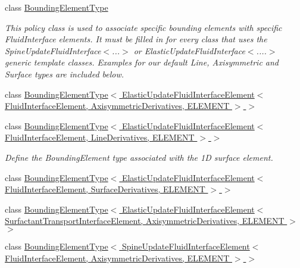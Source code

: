 \begin{DoxyCompactItemize}
class \hyperlink{classoomph_1_1BoundingElementType}{Bounding\+Element\+Type}
\begin{DoxyCompactList}\small\item\em This policy class is used to associate specific bounding elements with specific Fluid\+Interface elements. It must be filled in for every class that uses the Spine\+Update\+Fluid\+Interface$<$...$>$ or Elastic\+Update\+Fluid\+Interface$<$....$>$ generic template classes. Examples for our default Line, Axisymmetric and Surface types are included below. \end{DoxyCompactList}\item 
class \hyperlink{classoomph_1_1BoundingElementType_3_01ElasticUpdateFluidInterfaceElement_3_01FluidInterfaceEleme3184fbb3565ba21902c1c3c09e7b1c72}{Bounding\+Element\+Type$<$ Elastic\+Update\+Fluid\+Interface\+Element$<$ Fluid\+Interface\+Element, Axisymmetric\+Derivatives, E\+L\+E\+M\+E\+N\+T $>$ $>$}
\item 
class \hyperlink{classoomph_1_1BoundingElementType_3_01ElasticUpdateFluidInterfaceElement_3_01FluidInterfaceEleme25258208c656cd18bb5e78a946d0c1ca}{Bounding\+Element\+Type$<$ Elastic\+Update\+Fluid\+Interface\+Element$<$ Fluid\+Interface\+Element, Line\+Derivatives, E\+L\+E\+M\+E\+N\+T $>$ $>$}
\begin{DoxyCompactList}\small\item\em Define the Bounding\+Element type associated with the 1D surface element. \end{DoxyCompactList}\item 
class \hyperlink{classoomph_1_1BoundingElementType_3_01ElasticUpdateFluidInterfaceElement_3_01FluidInterfaceEleme0e022f57b173f7bea5703185db24e722}{Bounding\+Element\+Type$<$ Elastic\+Update\+Fluid\+Interface\+Element$<$ Fluid\+Interface\+Element, Surface\+Derivatives, E\+L\+E\+M\+E\+N\+T $>$ $>$}
\item 
class \hyperlink{classoomph_1_1BoundingElementType_3_01ElasticUpdateFluidInterfaceElement_3_01SurfactantTransportdc53e7a70087d96a28c80f422fe03679}{Bounding\+Element\+Type$<$ Elastic\+Update\+Fluid\+Interface\+Element$<$ Surfactant\+Transport\+Interface\+Element, Axisymmetric\+Derivatives, E\+L\+E\+M\+E\+N\+T $>$ $>$}
\item 
class \hyperlink{classoomph_1_1BoundingElementType_3_01SpineUpdateFluidInterfaceElement_3_01FluidInterfaceElement7e4c3b8d4bf0b8ea24b4420ab41b2522}{Bounding\+Element\+Type$<$ Spine\+Update\+Fluid\+Interface\+Element$<$ Fluid\+Interface\+Element, Axisymmetric\+Derivatives, E\+L\+E\+M\+E\+N\+T $>$ $>$}

\end{DoxyCompactItemize}
